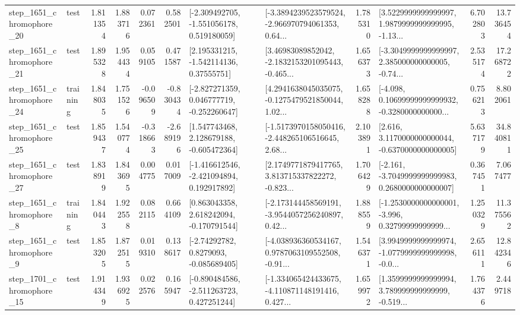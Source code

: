 \begin{tabular}{llrrrrllrlrr}
 step\_1651\_chromophore\_20 &      test &      1.811354 &    1.883716 &      0.072361 &  0.582501 &   [-2.309492705, -1.551056178, 0.519180059] &  [-3.3894239523579524, -2.966970794061353, 0.64... &       1.785310 &  [3.5229999999999997, 1.9879999999999995, -1.13... &            6.702803 &         13.736454 \\
 step\_1651\_chromophore\_21 &      test &      1.895328 &    1.954434 &      0.059105 &  0.471587 &     [2.195331215, -1.542114136, 0.37555751] &  [3.46983089852042, -2.1832153201095443, -0.465... &       1.656373 &  [-3.3049999999999997, 2.385000000000005, -0.74... &            2.535174 &         17.268722 \\
 step\_1651\_chromophore\_24 &  training &      1.848035 &    1.751526 &     -0.096509 & -0.830434 &   [-2.827271359, 0.046777719, -0.252260647] &  [4.2941638045035075, -0.1275479521850044, 1.02... &       1.658288 &  [-4.098, 0.10699999999999932, -0.3280000000000... &            0.756213 &          8.802061 \\
 step\_1651\_chromophore\_25 &      test &      1.859437 &    1.540774 &     -0.318663 & -2.689196 &    [1.547743468, 2.128679188, -0.605472364] &  [-1.5173970158050416, -2.448265106516645, 2.68... &       2.103891 &   [2.616, 3.1170000000000044, -0.6370000000000005] &            5.637179 &         34.840811 \\
 step\_1651\_chromophore\_27 &      test &      1.838919 &    1.843695 &      0.004775 &  0.017009 &   [-1.416612546, -2.421094894, 0.192917892] &  [2.1749771879417765, 3.813715337822272, -0.823... &       1.706429 &  [-2.161, -3.7049999999999983, 0.2680000000000007] &            0.367451 &          7.067477 \\
  step\_1651\_chromophore\_8 &  training &      1.840443 &    1.922558 &      0.082115 &  0.664109 &    [0.863043358, 2.618242094, -0.170791544] &  [-2.173144458569191, -3.9544057256240897, 0.42... &       1.888559 &  [-1.2530000000000001, -3.996, 0.32799999999999... &            1.250329 &         11.375562 \\
  step\_1651\_chromophore\_9 &      test &      1.853205 &    1.872515 &      0.019310 &  0.138617 &      [-2.74292782, 0.8279093, -0.085689405] &  [-4.038936360534167, 0.9787063109552508, -0.91... &       1.546371 &  [3.9949999999999974, -1.0779999999999998, -0.0... &            2.656111 &         12.842346 \\
 step\_1701\_chromophore\_15 &      test &      1.914349 &    1.936925 &      0.022576 &  0.165947 &   [-0.890484586, -2.511263723, 0.427251244] &  [-1.334065424433675, -4.110871148191416, 0.427... &       1.659972 &  [1.3599999999999994, 3.789999999999999, -0.519... &            1.764376 &          2.449718 \\

\end{tabular}
